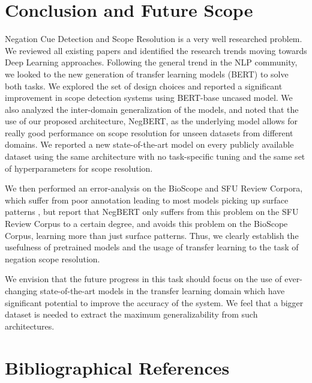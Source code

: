 \documentclass[10pt, a4paper]{article}
\begin{document}
\section{Conclusion and Future Scope}
\par Negation Cue Detection and Scope Resolution is a very well researched problem. We reviewed all existing papers and identified the research trends moving towards Deep Learning approaches. Following the general trend in the NLP community, we looked to the new generation of transfer learning models (BERT) to solve both tasks. We explored the set of design choices and reported a significant improvement in scope detection systems using BERT-base uncased model. We also analyzed the inter-domain generalization of the models, and noted that the use of our proposed architecture, NegBERT, as the underlying model allows for really good performance on scope resolution for unseen datasets from different domains. We reported a new state-of-the-art model on every publicly available dataset using the same architecture with no task-specific tuning and the same set of hyperparameters for scope resolution. 
\par We then performed an error-analysis on the BioScope and SFU Review Corpora, which suffer from poor annotation leading to most models picking up surface patterns \cite{fancellu-etal-2017-detecting}, but report that NegBERT only suffers from this problem on the SFU Review Corpus to a certain degree, and avoids this problem on the BioScope Corpus, learning more than just surface patterns. Thus, we clearly establish the usefulness of pretrained models and the usage of transfer learning to the task of negation scope resolution.
\par We envision that the future progress in this task should focus on the use of ever-changing state-of-the-art models in the transfer learning domain which have significant potential to improve the accuracy of the system. We feel that a bigger dataset is needed to extract the maximum generalizability from such architectures.
\section{Bibliographical References}\label{reference}




\end{document}

